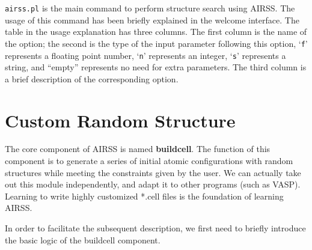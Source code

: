 \documentclass[a4paper, 10pt]{article}
\begin{document}
\verb|airss.pl| is the main command to perform structure search using AIRSS. The usage of this command has been briefly explained in the welcome interface. The table in the usage explanation has three columns. The first column is the name of the option; the second is the type of the input parameter following this option, `\verb|f|' represents a floating point number, `\verb|n|' represents an integer, `\verb|s|' represents a string, and ``empty'' represents no need for extra parameters. The third column is a brief description of the corresponding option.

\newpage
\section{Custom Random Structure}

The core component of AIRSS is named \textbf{buildcell}. The function of this component is to generate a series of initial atomic configurations with random structures while meeting the constraints given by the user. We can actually take out this module independently, and adapt it to other programs (such as VASP). Learning to write highly customized *.cell files is the foundation of learning AIRSS.

In order to facilitate the subsequent description, we first need to briefly introduce the basic logic of the buildcell component.
\end{document}
